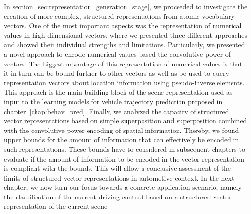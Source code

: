 In section~\ref{sec:representation_generation_stage}, we proceeded to investigate the creation of more complex, structured representations from atomic vocabulary vectors.
One of the most important aspects was the representation of numerical values in high-dimensional vectors, where we presented three different approaches and showed their individual strengths and limitations.
Particularly, we presented a novel approach to encode numerical values based the convolutive power of vectors.
The biggest advantage of this representation of numerical values is that it in turn can be bound further to other vectors as well as be used to query representation vectors about location information using pseudo-inverse elements.
This approach is the main building block of the scene representation used as input to the learning models for vehicle trajectory prediction proposed in chapter~\ref{chap:behav_pred}.
Finally, we analyzed the capacity of structured vector representations based on simple superposition and superposition combined with the convolutive power encoding of spatial information.
Thereby, we found upper bounds for the amount of information that can effectively be encoded in such representations.
These bounds have to considered in subsequent chapters to evaluate if the amount of information to be encoded in the vector representation is compliant with the bounds.
This will allow a conclusive assessment of the limits of structured vector representations in automotive context.
In the next chapter, we now turn our focus towards a concrete application scenario, namely the classification of the current driving context based on a structured vector representation of the current scene.

